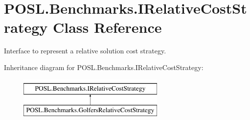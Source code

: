 \hypertarget{interfacePOSL_1_1Benchmarks_1_1IRelativeCostStrategy}{}\section{P\+O\+S\+L.\+Benchmarks.\+I\+Relative\+Cost\+Strategy Class Reference}
\label{interfacePOSL_1_1Benchmarks_1_1IRelativeCostStrategy}


Interface to represent a relative solution cost strategy.  


Inheritance diagram for P\+O\+S\+L.\+Benchmarks.\+I\+Relative\+Cost\+Strategy\+:\begin{figure}[H]
\begin{center}
\leavevmode
\includegraphics[height=2.000000cm]{interfacePOSL_1_1Benchmarks_1_1IRelativeCostStrategy}
\end{center}
\end{figure}
